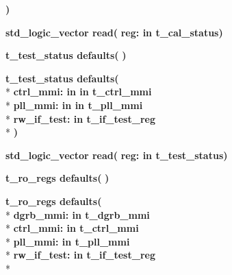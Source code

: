 \begin{DoxyCompactItemize}
{\bfseries  )} 
\item 
{\bfseries {\bfseries \textcolor{comment}{std\+\_\+logic\+\_\+vector}\textcolor{vhdlchar}{ }}} {\bf read}{\bfseries  ( }{\bfseries \textcolor{vhdlchar}{reg\+: }\textcolor{stringliteral}{in }\textcolor{vhdlchar}{t\+\_\+cal\+\_\+status}}{\bfseries  )} 
\item 
{\bfseries {\bfseries \textcolor{vhdlchar}{t\+\_\+test\+\_\+status}\textcolor{vhdlchar}{ }}} {\bf defaults}{\bfseries  ( }{\bfseries  )} 
\item 
{\bfseries {\bfseries \textcolor{vhdlchar}{t\+\_\+test\+\_\+status}\textcolor{vhdlchar}{ }}} {\bf defaults}{\bfseries  ( }\\*
{\bfseries \textcolor{vhdlchar}{ctrl\+\_\+mmi\+: }\textcolor{stringliteral}{in }\textcolor{vhdlchar}{in t\+\_\+ctrl\+\_\+mmi}}\\*
{\bfseries \textcolor{vhdlchar}{pll\+\_\+mmi\+: }\textcolor{stringliteral}{in }\textcolor{vhdlchar}{in t\+\_\+pll\+\_\+mmi}}\\*
{\bfseries \textcolor{vhdlchar}{rw\+\_\+if\+\_\+test\+: }\textcolor{stringliteral}{in }\textcolor{vhdlchar}{t\+\_\+if\+\_\+test\+\_\+reg}}\\*
{\bfseries  )} 
\item 
{\bfseries {\bfseries \textcolor{comment}{std\+\_\+logic\+\_\+vector}\textcolor{vhdlchar}{ }}} {\bf read}{\bfseries  ( }{\bfseries \textcolor{vhdlchar}{reg\+: }\textcolor{stringliteral}{in }\textcolor{vhdlchar}{t\+\_\+test\+\_\+status}}{\bfseries  )} 
\item 
{\bfseries {\bfseries \textcolor{vhdlchar}{t\+\_\+ro\+\_\+regs}\textcolor{vhdlchar}{ }}} {\bf defaults}{\bfseries  ( }{\bfseries  )} 
\item 
{\bfseries {\bfseries \textcolor{vhdlchar}{t\+\_\+ro\+\_\+regs}\textcolor{vhdlchar}{ }}} {\bf defaults}{\bfseries  ( }\\*
{\bfseries \textcolor{vhdlchar}{dgrb\+\_\+mmi\+: }\textcolor{stringliteral}{in }\textcolor{vhdlchar}{t\+\_\+dgrb\+\_\+mmi}}\\*
{\bfseries \textcolor{vhdlchar}{ctrl\+\_\+mmi\+: }\textcolor{stringliteral}{in }\textcolor{vhdlchar}{t\+\_\+ctrl\+\_\+mmi}}\\*
{\bfseries \textcolor{vhdlchar}{pll\+\_\+mmi\+: }\textcolor{stringliteral}{in }\textcolor{vhdlchar}{t\+\_\+pll\+\_\+mmi}}\\*
{\bfseries \textcolor{vhdlchar}{rw\+\_\+if\+\_\+test\+: }\textcolor{stringliteral}{in }\textcolor{vhdlchar}{t\+\_\+if\+\_\+test\+\_\+reg}}\\*

\end{DoxyCompactItemize}
